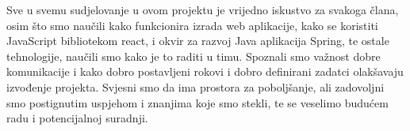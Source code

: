           Sve u svemu sudjelovanje u ovom projektu je vrijedno iskustvo za svakoga člana, osim što smo naučili kako funkcionira izrada web aplikacije, kako se koristiti JavaScript bibliotekom react, i okvir za razvoj Java aplikacija Spring, te ostale tehnologije, naučili smo kako je to raditi u timu.  Spoznali smo važnost dobre komunikacije i kako dobro postavljeni rokovi i dobro definirani zadatci olakšavaju izvođenje projekta. Svjesni smo da ima prostora za poboljšanje, ali zadovoljni smo postignutim uspjehom i znanjima koje smo stekli, te se veselimo budućem radu i potencijalnoj suradnji.
		
		\eject 
